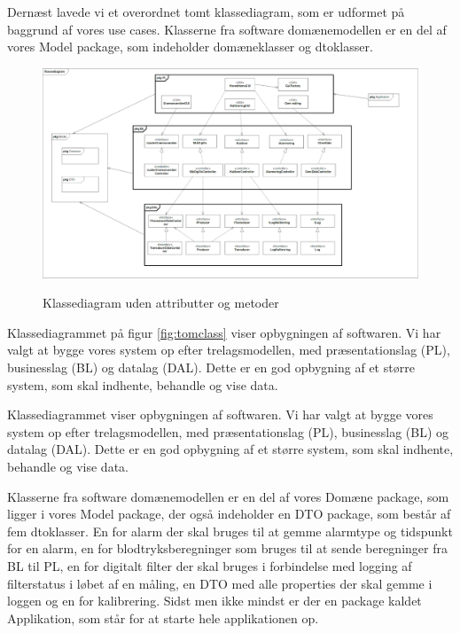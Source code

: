 Dernæst lavede vi et overordnet tomt klassediagram, som er udformet på baggrund af vores use cases. Klasserne fra software domænemodellen er en del af vores Model package, som indeholder domæneklasser og dtoklasser. 

\clearpage

\begin{figure}[h!]
	\centering
	\includegraphics[width=1\linewidth]{Arkitektur_og_design/Softwarearkitektur/tomclass}
	\label{fig:tomclass}
	\caption{Klassediagram uden attributter og metoder}
\end{figure}

Klassediagrammet på figur \vref{fig:tomclass} viser opbygningen af softwaren. Vi har valgt at bygge vores system op efter trelagsmodellen, med præsentationslag (PL), businesslag (BL) og datalag (DAL). Dette er en god opbygning af et større system, som skal indhente, behandle og vise data.

Klassediagrammet viser opbygningen af softwaren. Vi har valgt at bygge vores system op efter trelagsmodellen, med præsentationslag (PL), businesslag (BL) og datalag (DAL). Dette er en god opbygning af et større system, som skal indhente, behandle og vise data. 

Klasserne fra software domænemodellen er en del af vores Domæne package, som ligger i vores Model package, der også indeholder en DTO package, som består af fem dtoklasser. En for alarm der skal bruges til at gemme alarmtype og tidspunkt for en alarm, en for blodtryksberegninger som bruges til at sende beregninger fra BL til PL, en for digitalt filter der skal bruges i forbindelse med logging af filterstatus i løbet af en måling, en DTO med alle properties der skal gemme i loggen og en for kalibrering. Sidst men ikke mindst er der en package kaldet Applikation, som står for at starte hele applikationen op. 

